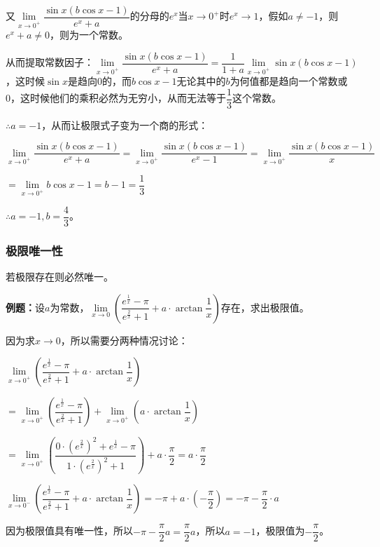 \documentclass[UTF8, 12pt]{ctexart}
\begin{document}
\medskip

又$\lim\limits_{x\to 0^+}\dfrac{\sin x(b\cos x-1)}{e^x+a}$的分母的$e^x$当$x\to 0^+$时$e^x\to 1$，假如$a\neq-1$，则$e^x+a\neq 0$，则为一个常数。

从而提取常数因子：$\lim\limits_{x\to 0^+}\dfrac{\sin x(b\cos x-1)}{e^x+a}=\dfrac{1}{1+a}\lim\limits_{x\to 0^+}\sin x(b\cos x-1)$，这时候$\sin x$是趋向0的，而$b\cos x-1$无论其中的$b$为何值都是趋向一个常数或0，这时候他们的乘积必然为无穷小，从而无法等于$\dfrac{1}{3}$这个常数。

$\therefore a=-1$，从而让极限式子变为一个商的形式：\medskip

$\lim\limits_{x\to 0^+}\dfrac{\sin x(b\cos x-1)}{e^x+a}=\lim\limits_{x\to 0^+}\dfrac{\sin x(b\cos x-1)}{e^x-1}=\lim\limits_{x\to 0^+}\dfrac{\sin x(b\cos x-1)}{x}$\medskip

$=\lim\limits_{x\to 0^+}b\cos x-1=b-1=\dfrac{1}{3}$\medskip

$\therefore a=-1,b=\dfrac{4}{3}$。

\subsubsection{极限唯一性}

若极限存在则必然唯一。

\textbf{例题：}设$a$为常数，$\lim\limits_{x\to 0}\left(\dfrac{e^{\frac{1}{x}}-\pi}{e^{\frac{2}{x}}+1}+a\cdot\arctan\dfrac{1}{x}\right)$存在，求出极限值。

因为求$x\to 0$，所以需要分两种情况讨论：

\medskip

$\lim\limits_{x\to 0^+}\left(\dfrac{e^{\frac{1}{x}}-\pi}{e^{\frac{2}{x}}+1}+a\cdot\arctan\dfrac{1}{x}\right)$

$=\lim\limits_{x\to 0^+}\left(\dfrac{e^{\frac{1}{x}}-\pi}{e^{\frac{2}{x}}+1}\right)+\lim\limits_{x\to 0^+}\left(a\cdot\arctan\dfrac{1}{x}\right)$

$=\lim\limits_{x\to 0^+}\left(\dfrac{0\cdot\left(e^{\frac{2}{x}}\right)^2+e^{\frac{1}{x}}-\pi}{1\cdot\left(e^{\frac{2}{x}}\right)^2+1}\right)+a\cdot\dfrac{\pi}{2}=a\cdot\dfrac{\pi}{2}$

\medskip

$\lim\limits_{x\to 0^-}\left(\dfrac{e^{\frac{1}{x}}-\pi}{e^{\frac{2}{x}}+1}+a\cdot\arctan\dfrac{1}{x}\right)=-\pi+a\cdot\left(-\dfrac{\pi}{2}\right)=-\pi-\dfrac{\pi}{2}\cdot a$

因为极限值具有唯一性，所以$-\pi-\dfrac{\pi}{2}a=\dfrac{\pi}{2}a$，所以$a=-1$，极限值为$-\dfrac{\pi}{2}$。
\end{document}
